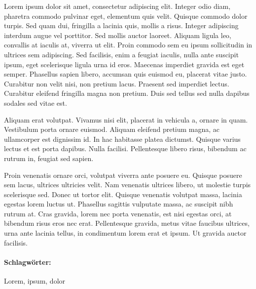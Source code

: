 Lorem ipsum dolor sit amet, consectetur adipiscing elit. Integer odio diam, pharetra commodo pulvinar eget, elementum quis velit. Quisque commodo dolor turpis. Sed quam dui, fringilla a lacinia quis, mollis a risus. Integer adipiscing interdum augue vel porttitor. Sed mollis auctor laoreet. Aliquam ligula leo, convallis at iaculis at, viverra ut elit. Proin commodo sem eu ipsum sollicitudin in ultrices sem adipiscing. Sed facilisis, enim a feugiat iaculis, nulla ante suscipit ipsum, eget scelerisque ligula urna id eros. Maecenas imperdiet gravida est eget semper. Phasellus sapien libero, accumsan quis euismod eu, placerat vitae justo. Curabitur non velit nisi, non pretium lacus. Praesent sed imperdiet lectus. Curabitur eleifend fringilla magna non pretium. Duis sed tellus sed nulla dapibus sodales sed vitae est.

Aliquam erat volutpat. Vivamus nisi elit, placerat in vehicula a, ornare in quam. Vestibulum porta ornare euismod. Aliquam eleifend pretium magna, ac ullamcorper est dignissim id. In hac habitasse platea dictumst. Quisque varius lectus et est porta dapibus. Nulla facilisi. Pellentesque libero risus, bibendum ac rutrum in, feugiat sed sapien.

Proin venenatis ornare orci, volutpat viverra ante posuere eu. Quisque posuere sem lacus, ultrices ultricies velit. Nam venenatis ultrices libero, ut molestie turpis scelerisque sed. Donec ut tortor elit. Quisque venenatis volutpat massa, lacinia egestas lorem luctus ut. Phasellus sagittis vulputate massa, ac suscipit nibh rutrum at. Cras gravida, lorem nec porta venenatis, est nisi egestas orci, at bibendum risus eros nec erat. Pellentesque gravida, metus vitae faucibus ultrices, urna ante lacinia tellus, in condimentum lorem erat et ipsum. Ut gravida auctor facilisis.


\paragraph{Schlagwörter:} Lorem, ipsum, dolor


